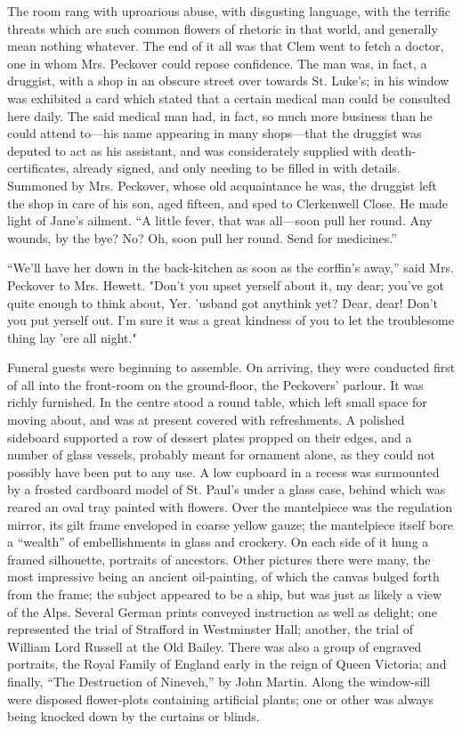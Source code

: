 The room rang with uproarious abuse, with disgusting language, with the
terrific threats which are such common flowers of rhetoric in that
world, and generally mean nothing whatever. The end of it all was that
Clem went to fetch a doctor, one in whom Mrs. Peckover could repose
confidence. The man was, in fact, a druggist, with a shop in an obscure
street over towards St. Luke's; in {}his window was exhibited a card
which stated that a certain medical man could be consulted here daily.
The said medical man had, in fact, so much more business than he could
attend to---his name appearing in many shops---that the druggist was
deputed to act as his assistant, and was considerately supplied with
death- certificates, already signed, and only needing to be filled in
with details. Summoned by Mrs. Peckover, whose old acquaintance he was,
the druggist left the shop in care of his son, aged fifteen, and sped to
Clerkenwell Close. He made light of Jane's ailment. ``A little fever,
that was all---soon pull her round. Any wounds, by the bye? No? Oh, soon
pull her round. Send for medicines.''

``We'll have her down in the back-kitchen as soon as the corffin's
away,'' said Mrs. Peckover to Mrs. Hewett. "Don't you upset yerself
about it, my dear; you've got quite enough to think about, Yer. 'usband
got anythink yet? Dear, dear! Don't you put yerself out. I'm sure it was
a great {}kindness of you to let the troublesome thing lay 'ere all
night."

Funeral guests were beginning to assemble. On arriving, they were
conducted first of all into the front-room on the ground-floor, the
Peckovers' parlour. It was richly furnished. In the centre stood a round
table, which left small space for moving about, and was at present
covered with refreshments. A polished sideboard supported a row of
dessert plates propped on their edges, and a number of glass vessels,
probably meant for ornament alone, as they could not possibly have been
put to any use. A low cupboard in a recess was surmounted by a frosted
cardboard model of St. Paul's under a glass case, behind which was
reared an oval tray painted with flowers. Over the mantelpiece was the
regulation mirror, its gilt frame enveloped in coarse yellow gauze; the
mantelpiece itself bore a ``wealth'' of embellishments in glass and
crockery. On each side of it hung a framed silhouette, portraits of
ancestors. Other pictures there were many, the most {}impressive being
an ancient oil-painting, of which the canvas bulged forth from the
frame; the subject appeared to be a ship, but was just as likely a view
of the Alps. Several German prints conveyed instruction as well as
delight; one represented the trial of Strafford in Westminster Hall;
another, the trial of William Lord Russell at the Old Bailey. There was
also a group of engraved portraits, the Royal Family of England early in
the reign of Queen Victoria; and finally, ``The Destruction of
Nineveh,'' by John Martin. Along the window-sill were disposed
flower-plots containing artificial plants; one or other was always being
knocked down by the curtains or blinds.

